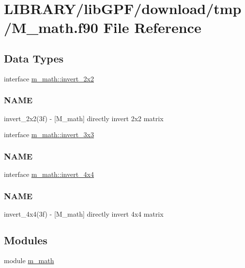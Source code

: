 \hypertarget{M__math_8f90}{}\section{L\+I\+B\+R\+A\+R\+Y/lib\+G\+P\+F/download/tmp/\+M\+\_\+math.f90 File Reference}
\label{M__math_8f90}
\subsection*{Data Types}
\begin{DoxyCompactItemize}
\item 
interface \hyperlink{interfacem__math_1_1invert__2x2}{m\+\_\+math\+::invert\+\_\+2x2}
\begin{DoxyCompactList}\small\item\em \subsubsection*{N\+A\+ME}

invert\+\_\+2x2(3f) -\/ \mbox{[}M\+\_\+math\mbox{]} directly invert 2x2 matrix \end{DoxyCompactList}\item 
interface \hyperlink{interfacem__math_1_1invert__3x3}{m\+\_\+math\+::invert\+\_\+3x3}
\begin{DoxyCompactList}\small\item\em \subsubsection*{N\+A\+ME}\end{DoxyCompactList}\item 
interface \hyperlink{interfacem__math_1_1invert__4x4}{m\+\_\+math\+::invert\+\_\+4x4}
\begin{DoxyCompactList}\small\item\em \subsubsection*{N\+A\+ME}

invert\+\_\+4x4(3f) -\/ \mbox{[}M\+\_\+math\mbox{]} directly invert 4x4 matrix \end{DoxyCompactList}\end{DoxyCompactItemize}
\subsection*{Modules}
\begin{DoxyCompactItemize}
\item 
module \hyperlink{namespacem__math}{m\+\_\+math}
\end{DoxyCompactItemize}
